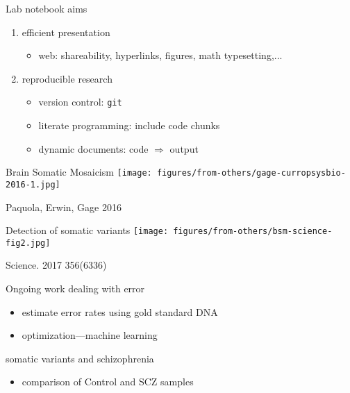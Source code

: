 \documentclass[usenames,dvipsnames]{beamer}
\begin{document}




\begin{frame}{Lab notebook}
aims
\begin{enumerate}
\item efficient presentation 
\begin{itemize}
\item<2> web: shareability, hyperlinks, figures, math typesetting,...
\end{itemize}
\item reproducible research
\begin{itemize}
\item<2> version control: \texttt{git}
\item<2> literate programming: include code chunks
\item<2> dynamic documents: code \(\Rightarrow\) output
\end{itemize}
\end{enumerate}
\end{frame}

\begin{frame}{Brain Somatic Mosaicism}
\texttt{[image: figures/from-others/gage-curropsysbio-2016-1.jpg]}

{\tiny Paquola, Erwin, Gage 2016}
\end{frame}

\begin{frame}{Detection of somatic variants}
\texttt{[image: figures/from-others/bsm-science-fig2.jpg]}

{\tiny Science. 2017 356(6336)}
\end{frame}

\begin{frame}{Ongoing work}
dealing with error
\begin{itemize}
\item estimate error rates using gold standard DNA
\item optimization---machine learning
\end{itemize}
\vfill
somatic variants and schizophrenia
\begin{itemize}
\item comparison of Control and SCZ samples
\end{itemize} 
\end{frame}
\end{document}
